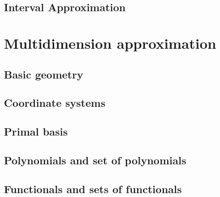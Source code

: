 \subsection[Interval]{Interval Approximation}
\label{sec:interv-interp}

\begin{frame}{}
  
\end{frame}


\section{Multidimension approximation}
\label{sec:mult-interp}

\subsection{Basic geometry}
\label{sec:basic-geometry}

\begin{frame}{}
  
\end{frame}

\subsection{Coordinate systems}
\label{sec:coordinate-systems}

\begin{frame}{}
  
\end{frame}

\subsection{Primal basis}
\label{sec:primal-basis}

\begin{frame}{}
  
\end{frame}

\subsection{Polynomials and set of polynomials}
\label{sec:polyn-set-polyn}

\begin{frame}{}
  
\end{frame}

\subsection{Functionals and sets of functionals}
\label{sec:functionals}

